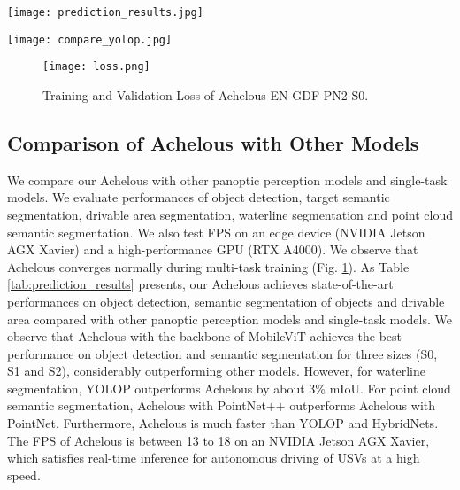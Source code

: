 \documentclass[letterpaper, 10 pt, conference]{ieeeconf}
\begin{document}
\begin{figure*}
    \centering
    \texttt{[image: prediction\_results.jpg]}
    \caption{Panoptic Perception Results of Achelous-EN-CDF-PN-S0, object detection, segmentation of targets, drivable area and waterline, and point cloud semantic segmentation. (a) Dark environment. (b) Occluded ships on a dense foggy day. (c) The lens blocked by water droplets. (d) Dense targets.}
    \label{fig:prediction_results}
\end{figure*}

\begin{figure*}
    \centering
    \texttt{[image: compare\_yolop.jpg]}
    \caption{Comparison of Achelous-MV-GDF-PN-S0 (4.4 million parameters less than YOLOP) with YOLOP under various situations.}
    \label{fig:yolop_compare}
\end{figure*}


\begin{figure}
    \centering
    \texttt{[image: loss.png]}
    \caption{Training and Validation Loss of Achelous-EN-GDF-PN2-S0.}
    \label{fig:loss_example}
\end{figure}





\subsection{Comparison of Achelous with Other Models}
We compare our Achelous with other panoptic perception models and single-task models. We evaluate performances of object detection, target semantic segmentation, drivable area segmentation, waterline segmentation and point cloud semantic segmentation. We also test FPS on an edge device (NVIDIA Jetson AGX Xavier) and a high-performance GPU (RTX A4000). We observe that Achelous converges normally during multi-task training (Fig. \ref{fig:loss_example}). As Table \ref{tab:prediction_results} presents, our Achelous achieves state-of-the-art performances on object detection, semantic segmentation of objects and drivable area compared with other panoptic perception models and single-task models. We observe that Achelous with the backbone of MobileViT achieves the best performance on object detection and semantic segmentation for three sizes (S0, S1 and S2), considerably outperforming other models. However, for waterline segmentation, YOLOP outperforms Achelous by about 3\% mIoU. For point cloud semantic segmentation, Achelous with PointNet++ outperforms Achelous with PointNet. Furthermore, Achelous is much faster than YOLOP and HybridNets. The FPS of Achelous is between 13 to 18 on an NVIDIA Jetson AGX Xavier, which satisfies real-time inference for autonomous driving of USVs at a high speed.
\end{document}
